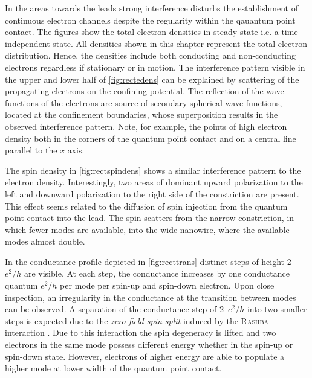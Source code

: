 In the areas towards the leads strong interference disturbs the establishment of continuous electron channels despite the regularity within the qauantum point contact. The figures show the total electron densities in steady state i.e. a time independent state. All densities shown in this chapter represent the total electron distribution. Hence, the densities include both conducting and non-conducting electrons regardless if stationary or in motion. The interference pattern visible in the upper and lower half of \cref{fig:rectedens} can be explained by scattering of the propagating electrons on the confining potential. The reflection of the wave functions of the electrons are source of secondary spherical wave functions, located at the confinement boundaries, whose superposition results in the observed interference pattern. Note, for example, the points of high electron density both in the corners of the quantum point contact and on a central line parallel to the $x$ axis.\par
The spin density in \cref{fig:rectspindens} shows a similar interference pattern to the electron density. Interestingly, two areas of dominant upward polarization to the left and downward polarization to the right side of the constriction are present. This effect seems related to the diffusion of spin injection from the quantum point contact into the lead. The spin scatters from the narrow constriction, in which fewer modes are available, into the wide nanowire, where the available modes almost double.\par
In the conductance profile depicted in \cref{fig:recttrans} distinct steps of height 2~$e^2/h$ are visible. At each step, the conductance increases by one conductance quantum $e^2/h$ per mode per spin-up and spin-down electron. Upon close inspection, an irregularity in the conductance at the transition between modes can be observed. A separation of the conductance step of 2~$e^2/h$  into two smaller steps is expected due to the \emph{zero field spin split} induced by the \textsc{Rashba} interaction \cite{PhysRevB.41.8278}. Due to this interaction the spin degeneracy is lifted and two electrons in the same mode possess different energy whether in the spin-up or spin-down state. However, electrons of higher energy are able to populate a higher mode at lower width of the quantum point contact.\par
\FloatBarrier
